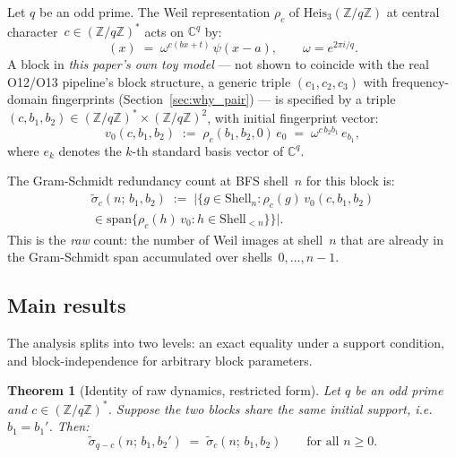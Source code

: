\documentclass[11pt,a4paper]{article}
\newtheorem{theorem}{Theorem}[section]
\theoremstyle{definition}
\newcommand{\Heis}{\mathrm{Heis}_3}
\newcommand{\ZqZ}{\mathbb{Z}/q\mathbb{Z}}
\newcommand{\Fq}{(\mathbb{Z}/q\mathbb{Z})^*}
\begin{document}
    Let $q$ be an odd prime.
    The Weil representation $\rho_c$ of $\Heis(\ZqZ)$ at central
    character~$c \in \Fq$ acts on $\mathbb{C}^q$ by:
    \begin{equation}
      [\rho_c(a,b,t)\,\psi](x) \;=\; \omega^{c(bx + t)}\,\psi(x-a),
      \qquad \omega = e^{2\pi i/q}.
      \label{eq:weil_def}
    \end{equation}
    A block in \emph{this paper's own toy model} --- not shown to
    coincide with the real O12/O13 pipeline's block structure, a generic
    triple $(c_1,c_2,c_3)$ with frequency-domain fingerprints
    (Section~\ref{sec:why_pair}) --- is specified by a triple
    $(c, b_1, b_2) \in \Fq \times (\ZqZ)^2$, with initial fingerprint
    vector:
    \begin{equation}
      v_0(c, b_1, b_2) \;:=\; \rho_c(b_1, b_2, 0)\,e_0
      \;=\; \omega^{c\,b_2 b_1}\,e_{b_1},
      \label{eq:v0}
    \end{equation}
    where $e_k$ denotes the $k$-th standard basis vector of $\mathbb{C}^q$.

    The Gram-Schmidt redundancy count at BFS shell~$n$ for this block is:
    \begin{multline}
      \tilde\sigma_c(n;\, b_1, b_2)
      \;:=\; \bigl|\bigl\{g \in \mathrm{Shell}_n :
      \rho_c(g)\,v_0(c,b_1,b_2) \\
      \in \mathrm{span}\bigl\{\rho_c(h)\,v_0 : h \in \mathrm{Shell}_{<n}\bigr\}\bigr\}\bigr|.
      \label{eq:raw_sigma}
    \end{multline}
    This is the \emph{raw} count: the number of Weil images at shell~$n$
    that are already in the Gram-Schmidt span accumulated over
    shells~$0, \ldots, n-1$.

  \subsection{Main results}

    The analysis splits into two levels: an exact equality under a support
    condition, and block-independence for arbitrary block parameters.

    \begin{theorem}[Identity of raw dynamics, restricted form]
      \label{thm:identity}
      Let $q$ be an odd prime and $c \in \Fq$.
      Suppose the two blocks share the same initial support, i.e.\ $b_1 = b_1'$.
      Then:
      \begin{equation}
        \tilde\sigma_{q-c}(n;\, b_1, b_2')
        \;=\; \tilde\sigma_c(n;\, b_1, b_2)
        \qquad \text{for all } n \geq 0.
        \label{eq:raw_identity}
      \end{equation}
    \end{theorem}
\end{document}
